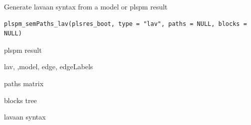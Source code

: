 \documentclass[a4paper]{book}
\begin{document}
%
\begin{Description}
Generate lavaan syntax from a model or plspm result
\end{Description}
%
\begin{Usage}
\begin{verbatim}
plspm_semPaths_lav(plsres_boot, type = "lav", paths = NULL, blocks = NULL)
\end{verbatim}
\end{Usage}
%
\begin{Arguments}
\begin{ldescription}
\item[\code{plsres\_boot}] plspm result

\item[\code{type}] lav, ,model, edge, edgeLabels

\item[\code{paths}] paths matrix

\item[\code{blocks}] blocks tree
\end{ldescription}
\end{Arguments}
%
\begin{Value}
lavaan syntax
\end{Value}
%
\end{document}
